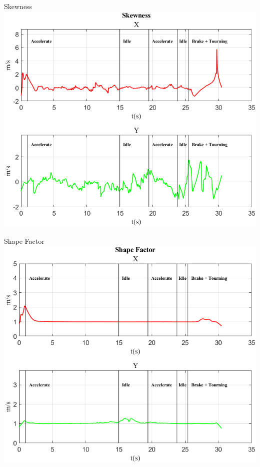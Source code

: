 \documentclass[beamer]{standalone}
\begin{document}
	\begin{frame}{{Skewness}}
		\centering\includegraphics[height=.8\textheight]{figure/Vel/Skewness}
	\end{frame}
	
	\begin{frame}{{Shape Factor}}
		\centering\includegraphics[height=.8\textheight]{figure/Vel/Shape Factor}
	\end{frame}
	
\end{document}
